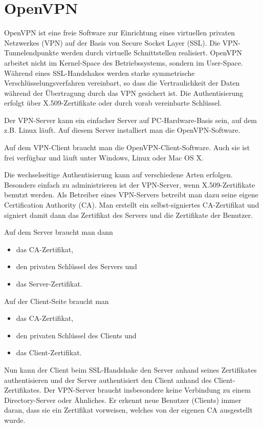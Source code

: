 \section{OpenVPN}
\label{sec:openvpn}

OpenVPN ist eine freie Software zur Einrichtung eines virtuellen privaten
Netz\-werk\-es (VPN) auf der Basis von Secure Socket Layer (SSL). Die
VPN-Tunnelendpunkte werden durch virtuelle Schnittstellen realisiert. OpenVPN
arbeitet nicht im Kernel-Space des Betriebssystems, sondern im
User-Space. Während eines SSL\hyp Handshakes werden starke symmetrische
Verschlüsselungsverfahren vereinbart, so dass die Vertraulichkeit der Daten
während der Übertragung durch das VPN gesichert ist. Die Authentisierung erfolgt
über X.509-Zertifikate oder durch vorab vereinbarte Schlüssel.

Der VPN-Server kann ein einfacher Server auf PC-Hardware-Basis sein, auf dem
z.B. Linux läuft. Auf diesem Server installiert man die OpenVPN-Software.

Auf dem VPN-Client braucht man die OpenVPN-Client-Software. Auch sie ist frei
verfügbar und läuft unter Windows, Linux oder Mac OS X.

Die wechselseitige Authentisierung kann auf verschiedene Arten
erfolgen. Besonders einfach zu administrieren ist der VPN-Server, wenn
X.509-Zertifikate benutzt werden. Als Betreiber eines VPN-Servers betreibt man
dazu seine eigene Certification Authority (CA). Man erstellt ein
selbst-signiertes CA-Zertifikat und signiert damit dann das Zertifikat des
Servers und die Zertifikate der Benutzer.

Auf dem Server braucht man dann

\begin{itemize}
  \item das CA-Zertifikat,
  \item den privaten Schlüssel des Servers und
  \item das Server-Zertifikat.
\end{itemize}

Auf der Client-Seite braucht man

\begin{itemize}
  \item das CA-Zertifikat,
  \item den privaten Schlüssel des Clients und
  \item das Client-Zertifikat.
\end{itemize}

Nun kann der Client beim SSL-Handshake den Server anhand seines Zertifikates
authentisieren und der Server authentisiert den Client anhand des
Client-Zertifikates. Der VPN-Server braucht insbesondere keine Verbindung zu
einem Directory-Server oder Ähnliches. Er erkennt neue Benutzer (Clients) immer
daran, dass sie ein Zertifikat vorweisen, welches von der eigenen CA ausgestellt
wurde.

